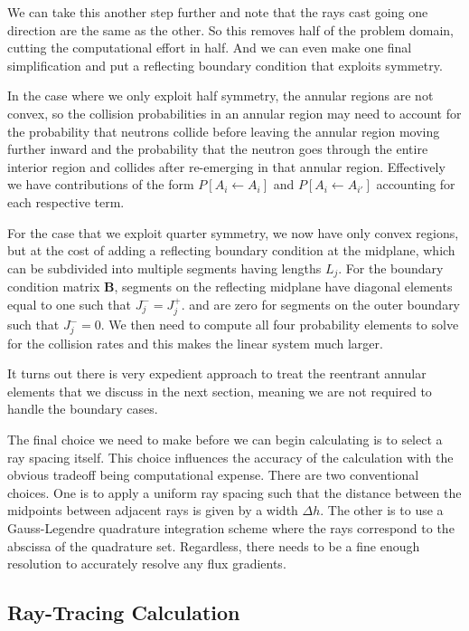 We can take this another step further and note that the rays cast going one direction are the same as the other. So this removes half of the problem domain, cutting the computational effort in half. And we can even make one final simplification and put a reflecting boundary condition that exploits symmetry.

In the case where we only exploit half symmetry, the annular regions are not convex, so the collision probabilities in an annular region may need to account for the probability that neutrons collide before leaving the annular region moving further inward and the probability that the neutron goes through the entire interior region and collides after re-emerging in that annular region. Effectively we have contributions of the form $P[ A_i \leftarrow A_i ]$ and $P[ A_i \leftarrow A_{i'}]$ accounting for each respective term.

For the case that we exploit quarter symmetry, we now have only convex regions, but at the cost of adding a reflecting boundary condition at the midplane, which can be subdivided into multiple segments having lengths $L_j$. For the boundary condition matrix $\mathbf{B}$, segments on the reflecting midplane have diagonal elements equal to one such that $J_j^- = J_j^+$. and are zero for segments on the outer boundary such that $J^-_j = 0$. We then need to compute all four probability elements to solve for the collision rates and this makes the linear system much larger.

It turns out there is very expedient approach to treat the reentrant annular elements that we discuss in the next section, meaning we are not required to handle the boundary cases.

The final choice we need to make before we can begin calculating is to select a ray spacing itself. This choice influences the accuracy of the calculation with the obvious tradeoff being computational expense. There are two conventional choices. One is to apply a uniform ray spacing such that the distance between the midpoints between adjacent rays is given by a width $\Delta h$. The other is to use a Gauss-Legendre quadrature integration scheme where the rays correspond to the abscissa of the quadrature set. Regardless, there needs to be a fine enough resolution to accurately resolve any flux gradients.




\subsection{Ray-Tracing Calculation}

